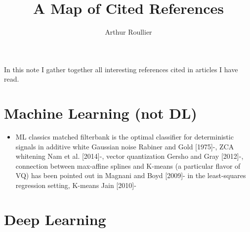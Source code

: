 \documentclass{article}
\title{A Map of Cited References}
\author{Arthur Roullier}
\begin{document}
\maketitle

%


In this note I gather together all interesting references cited in articles I have read.

\section{Machine Learning (not DL)}

\begin{itemize}
	\item ML classics
		\subitem matched filterbank is the optimal classifier for deterministic signals in additive white Gaussian noise Rabiner and Gold [1975]-\cite{balestriero_mad_2018}, ZCA whitening Nam et al. [2014]-\cite{balestriero_mad_2018}, vector quantization Gersho and Gray [2012]-\cite{balestriero_mad_2018}, connection between max-affine splines and K-means (a particular flavor of VQ) has been pointed out in Magnani and Boyd [2009]-\cite{balestriero_mad_2018} in the least-squares regression setting, K-means Jain [2010]-\cite{balestriero_mad_2018}
\end{itemize}


\section{Deep Learning}
\end{document}

